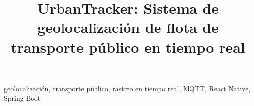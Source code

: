 \documentclass[conference]{IEEEtran}
\begin{document}
\title{UrbanTracker: Sistema de geolocalización de flota de transporte público en tiempo real}

\author{
}

\maketitle

\begin{abstract}

\end{abstract}

\begin{IEEEkeywords}
geolocalización, transporte público, rastreo en tiempo real, MQTT, React Native, Spring Boot
\end{IEEEkeywords}










\printbibliography
\end{document}
